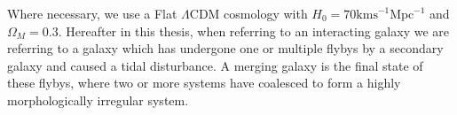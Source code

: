 Where necessary, we use a Flat $\Lambda$CDM cosmology with $H_{0} = 70\mathrm{kms}^{-1}\mathrm{Mpc}^{-1}$ and $\Omega_{M} = 0.3$. Hereafter in this thesis, when referring to an interacting galaxy we are referring to a galaxy which has undergone one or multiple flybys by a secondary galaxy and caused a tidal disturbance. A merging galaxy is the final state of these flybys, where two or more systems have coalesced to form a highly morphologically irregular system.